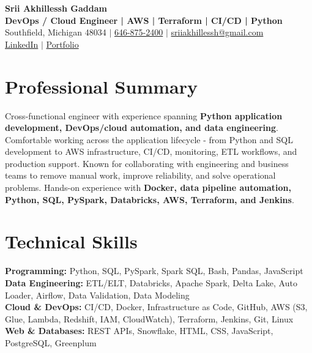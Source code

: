 \documentclass[letterpaper,10pt]{article}
\begin{document}
\fontsize{9.35pt}{10.45pt}\selectfont

\begin{center}
    {\LARGE \textbf{Srii Akhillessh Gaddam}} \\[-1pt]
    \textbf{DevOps / Cloud Engineer | AWS | Terraform | CI/CD | Python} \\[2pt]
    Southfield, Michigan 48034 $|$
    \href{tel:6468752400}{646-875-2400} $|$
    \href{mailto:sriiakhillessh@gmail.com}{sriiakhillessh@gmail.com} \\[1pt]
    \href{https://www.linkedin.com/in/srii-akhiilessh-gaddam-b48668191/}{LinkedIn} $|$
    \href{https://sriiakhillesshg.github.io/portfolio/}{Portfolio}
\end{center}
\vspace{-8pt}

\section{Professional Summary}
\small{Cross-functional engineer with experience spanning \textbf{Python application development, DevOps/cloud automation, and data engineering}. Comfortable working across the application lifecycle - from Python and SQL development to AWS infrastructure, CI/CD, monitoring, ETL workflows, and production support. Known for collaborating with engineering and business teams to remove manual work, improve reliability, and solve operational problems. Hands-on experience with \textbf{Docker, data pipeline automation, Python, SQL, PySpark, Databricks, AWS, Terraform, and Jenkins}.}

\section{Technical Skills}
\small{
\textbf{Programming:} Python, SQL, PySpark, Spark SQL, Bash, Pandas, JavaScript \\
\textbf{Data Engineering:} ETL/ELT, Databricks, Apache Spark, Delta Lake, Auto Loader, Airflow, Data Validation, Data Modeling \\
\textbf{Cloud \& DevOps:} CI/CD, Docker, Infrastructure as Code, GitHub, AWS (S3, Glue, Lambda, Redshift, IAM, CloudWatch), Terraform, Jenkins, Git, Linux \\
\textbf{Web \& Databases:} REST APIs, Snowflake, HTML, CSS, JavaScript, PostgreSQL, Greenplum
}
\end{document}
